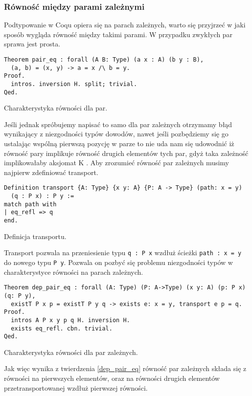 \subsubsection{Równość między parami zależnymi}
Podtypowanie w Coqu opiera się na parach zależnych, warto się przyjrzeć w jaki sposób wygląda równość między takimi parami. W przypadku zwykłych par sprawa jest prosta.
\begin{code}
\begin{verbatim}
Theorem pair_eq : forall (A B: Type) (a x : A) (b y : B),
  (a, b) = (x, y) -> a = x /\ b = y.
Proof.
  intros. inversion H. split; trivial.
Qed.
\end{verbatim}
\caption{Charakterystyka równości dla par.}
\label{pair_eq}
\end{code}
Jeśli jednak spróbujemy napisać to samo dla par zależnych otrzymamy błąd wynikający z niezgodności typów dowodów, nawet jeśli pozbędziemy się go ustalając wspólną pierwszą pozycję w parze to nie uda nam się udowodnić iż równość pary implikuje równość drugich elementów tych par, gdyż taka zależność implikowałaby aksjomat K \cite{Streicher}. Aby zrozumieć równość par zależnych musimy najpierw zdefiniować transport.
\begin{code}
\begin{verbatim}
Definition transport {A: Type} {x y: A} {P: A -> Type} (path: x = y) 
  (q : P x) : P y :=
match path with
| eq_refl => q
end.
\end{verbatim}
\caption{Definicja transportu.}
\label{transport}
\end{code}
Transport pozwala na przeniesienie typu \texttt{q : P x} wzdłuż ścieżki \texttt{path : x = y} do nowego typu \texttt{P y}. Pozwala on pozbyć się problemu niezgodności typów w charakterystyce równości na parach zależnych.
\begin{code}
\begin{verbatim}
Theorem dep_pair_eq : forall (A: Type) (P: A->Type) (x y: A) (p: P x) (q: P y),
  existT P x p = existT P y q -> exists e: x = y, transport e p = q.
Proof.
  intros A P x y p q H. inversion H.
  exists eq_refl. cbn. trivial.
Qed.
\end{verbatim}
\caption{Charakterystyka równości dla par zależnych.}
\label{dep_pair_eq}
\end{code}
Jak więc wynika z twierdzenia \ref{dep_pair_eq} równość par zależnych składa się z równości na pierwszych elementów, oraz na równości drugich elementów przetransportowanej wzdłuż pierwszej równości.
